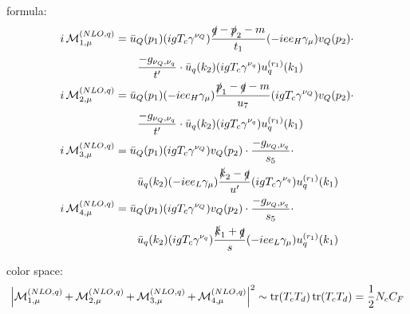 formula:
\begin{align}
i\operatorname{\mathcal M}^{(NLO,q)}_{1,\mu} &= \bar u_Q(p_1)(igT_c\gamma^{\nu_Q})\frac{\slashed{q}-\slashed{p}_2-m}{t_1}(-i e e_H \gamma_\mu)v_Q(p_2)\cdot \nonumber\\
 &\hspace{20pt}\frac{-g_{\nu_Q,\nu_q}}{t'} \cdot \bar u_q(k_2)(igT_c\gamma^{\nu_q})u^{(r_1)}_q(k_1)\\
i\operatorname{\mathcal M}^{(NLO,q)}_{2,\mu} &= \bar u_Q(p_1)(-i e e_H \gamma_\mu)\frac{\slashed{p}_1-\slashed{q}-m}{u_7}(igT_c\gamma^{\nu_Q})v_Q(p_2) \cdot \nonumber\\
&\hspace{20pt} \frac{-g_{\nu_Q,\nu_q}}{t'} \cdot \bar u_q(k_2)(igT_c\gamma^{\nu_q})u^{(r_1)}_q(k_1)\\
i\operatorname{\mathcal M}^{(NLO,q)}_{3,\mu} &= \bar u_Q(p_1)(igT_c\gamma^{\nu_Q})v_Q(p_2) \cdot \frac{-g_{\nu_Q,\nu_q}}{s_5} \cdot \nonumber\\
 &\hspace{20pt}\bar u_q(k_2)(-i e e_L \gamma_\mu)\frac{\slashed{k}_2-\slashed{q}}{u'}(igT_c\gamma^{\nu_q})u^{(r_1)}_q(k_1)\\
i\operatorname{\mathcal M}^{(NLO,q)}_{4,\mu} &= \bar u_Q(p_1)(igT_c\gamma^{\nu_Q})v_Q(p_2) \cdot \frac{-g_{\nu_Q,\nu_q}}{s_5} \cdot \nonumber\\
 &\hspace{20pt}\bar u_q(k_2)(igT_c\gamma^{\nu_q})\frac{\slashed{k}_1+\slashed{q}}{s}(-i e e_L \gamma_\mu)u^{(r_1)}_q(k_1)
\end{align}

color space:
\begin{equation}
\left|\operatorname{\mathcal M}^{(NLO,q)}_{1,\mu}+\operatorname{\mathcal M}^{(NLO,q)}_{2,\mu}+\operatorname{\mathcal M}^{(NLO,q)}_{3,\mu}+\operatorname{\mathcal M}^{(NLO,q)}_{4,\mu}\right|^2 \sim \operatorname{\text{tr}}(T_c T_d)\operatorname{\text{tr}}(T_c T_d) = \frac 1 2 N_c C_F
\end{equation}
